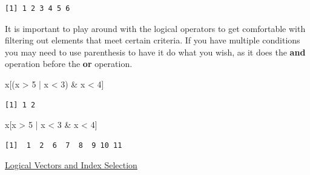 \documentclass[
  letterpaper,
  DIV=11,
  numbers=noendperiod]{scrreprt}
\newenvironment{Shaded}{\begin{snugshade}}{\end{snugshade}}
\newcommand{\DecValTok}[1]{\textcolor[rgb]{0.68,0.00,0.00}{#1}}
\newcommand{\NormalTok}[1]{\textcolor[rgb]{0.00,0.23,0.31}{#1}}
\newcommand{\SpecialCharTok}[1]{\textcolor[rgb]{0.37,0.37,0.37}{#1}}
\begin{document}
\begin{verbatim}
[1] 1 2 3 4 5 6
\end{verbatim}

It is important to play around with the logical operators to get
comfortable with filtering out elements that meet certain criteria. If
you have multiple conditions you may need to use parenthesis to have it
do what you wish, as it does the \textbf{and} operation before the
\textbf{or} operation.

\begin{Shaded}
\begin{Highlighting}[]
\NormalTok{x[(x }\SpecialCharTok{\textgreater{}} \DecValTok{5} \SpecialCharTok{|}\NormalTok{ x }\SpecialCharTok{\textless{}} \DecValTok{3}\NormalTok{) }\SpecialCharTok{\&}\NormalTok{ x }\SpecialCharTok{\textless{}} \DecValTok{4}\NormalTok{] }
\end{Highlighting}
\end{Shaded}

\begin{verbatim}
[1] 1 2
\end{verbatim}

\begin{Shaded}
\begin{Highlighting}[]
\NormalTok{x[x }\SpecialCharTok{\textgreater{}} \DecValTok{5} \SpecialCharTok{|}\NormalTok{ x }\SpecialCharTok{\textless{}} \DecValTok{3} \SpecialCharTok{\&}\NormalTok{ x }\SpecialCharTok{\textless{}} \DecValTok{4}\NormalTok{]}
\end{Highlighting}
\end{Shaded}

\begin{verbatim}
[1]  1  2  6  7  8  9 10 11
\end{verbatim}

\begin{watch}{}{}
    \href{https://youtu.be/QIrSEcEYRVk}{Logical Vectors and Index Selection}
\end{watch}
\end{document}
